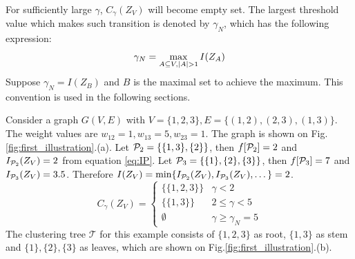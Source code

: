 \documentclass[runningheads]{llncs}
\begin{document}
For sufficiently large $\gamma$, $C_{\gamma} (Z_V)$ will become empty set. The largest threshold value which makes such transition is denoted by $\gamma_N$, which has the following expression:
\begin{equation}\label{eq:gammaN}
\gamma_N = \max_{A\subseteq V, \abs{A}>1} I(Z_A)
\end{equation}
Suppose $\gamma_N=I(Z_B)$ and $B$ is the maximal set to achieve the maximum. This convention is used in the following sections.

\begin{example}
	Consider a graph $G(V,E)$ with $V=\{1,2,3\}, E=\{(1,2),(2,3),(1,3)\}$. The weight values are $w_{12}=1, w_{13}=5, w_{23}=1$. The graph is shown on Fig.\ref{fig:first_illustration}.(a). Let $\P_2 = \{\{1,3\},\{2\}\}$, then $f[\P_2] = 2 $ and $I_{\P_2}(Z_V) = 2$ from equation \eqref{eq:IP}. Let $\P_3 = \{\{1\},\{2\},\{3\}\}$, then $f[\P_3] = 7$ and $I_{\P_3}(Z_V)=3.5$. Therefore $I(Z_V) = \min\{I_{\P_2}(Z_V), I_{\P_3}(Z_V), \dots\} = 2$. 
	\begin{equation*}
	C_{\gamma}(Z_V)	=\begin{cases}
					\{\{1,2,3\}\} & \gamma < 2 \\
					\{\{1,3\}\} & 2\leq \gamma < 5 \\
					\emptyset & \gamma \geq \gamma_N = 5
		\end{cases}
	\end{equation*}
	The clustering tree $\mathcal{T}$ for this example consists of $\{1,2,3\}$ as root, $\{1,3\}$ as stem and $\{1\},\{2\},\{3\}$ as leaves, which are shown on Fig.\ref{fig:first_illustration}.(b).
\end{example}	
\end{document}
